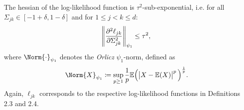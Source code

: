 \begin{condition}\label{Hessian statistical noise}
    The hessian of the log-likelihood function is $\tau^2$-sub-exponential, i.e. for all $\Sigma_{jk} \in [-1+\delta, 1-\delta]$ and for $1\leq j < k \leq d$:
    \begin{equation}
        \norm{\frac{\partial^2\ell_{jk}}{\partial \Sigma_{jk}^{2}}}_{\psi_{1}} \leq \tau^2,
    \end{equation}
    where $\Norm{\cdot}_{\psi_{1}}$ denotes the \textit{Orlicz} $\psi_{1}$-norm, defined as 
    \begin{equation*}
        \Norm{X}_{\psi_{1}} \coloneqq \sup_{p\geq 1} \frac{1}{p}\mathbb{E}\Big(\abs{X - \mathbb{E}(X)}^p\Big)^{\frac{1}{p}}.
    \end{equation*}
    Again, $\ell_{jk}$ corresponds to the respective log-likelihood functions in Definitions 2.3 and 2.4.%
    

\end{condition}

